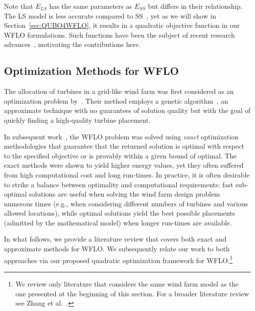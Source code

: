 \documentclass[preprint,12pt]{elsarticle}
\newcommand{\todo}[1]{{\textcolor{red}{\bf {#1}}}}
\begin{document}
Note that $E_{LS}$ has the same parameters as $E_{SS}$ but differs in their relationship.
The LS model is less accurate compared to SS~\cite{Zhang2014}, yet as we will show in Section~\ref{sec:QUBO4WFLO}, it 
 results in a quadratic objective function in our WFLO formulations. Such functions have been the subject of recent research advances~\cite{ku2017hybrid,bian2010ising}, motivating the contributions here.
 

\subsection{Optimization Methods for WFLO}

The allocation of turbines in a grid-like wind farm was first
considered as an optimization problem by~\citet{MOSETTI1994105}. Their
method employs a genetic
algorithm~\cite{davis1991handbook}, an approximate technique
with no guarantees of solution quality but with the goal of quickly finding a high-quality turbine placement.

In subsequent work~\cite{turner2014new,Zhang2014}, 
the WFLO problem was solved using \emph{exact}  
optimization methodologies that guarantee that the returned solution is optimal with respect
to the specified objective or is provably within a given bound of optimal.
The exact methods were shown to yield higher energy values, yet they often suffered from 
high computational cost and long run-times. In practice, it is often desirable to strike a balance between optimality and computational requirements: fast sub-optimal solutions are useful when solving the wind farm design problem numerous times (e.g., when considering different numbers of turbines and various allowed locations), while optimal solutions yield the best possible placements (admitted by the mathematical model) when longer run-times are available.

In what follows, we provide a literature review that covers both exact and approximate methods for WFLO. We subsequently relate our 
work to both approaches via our proposed quadratic optimization framework for WFLO.\footnote{We review 
only literature that considers the same wind farm model as the one presented at the beginning of this section. For a broader literature review see Zhang et al.\ \cite{Zhang2014}.} 
 
\end{document}
